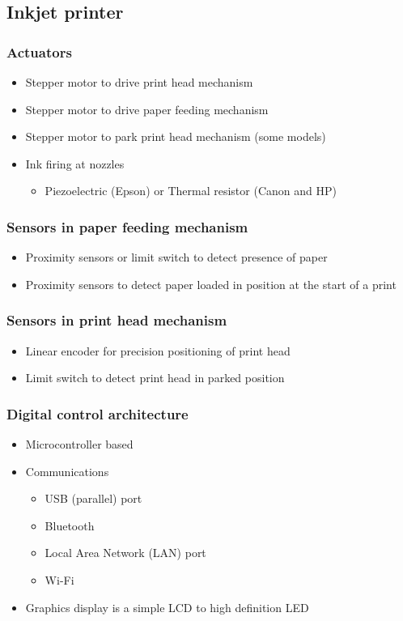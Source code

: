 \documentclass[11pt]{article}
\begin{document}
\subsection{Inkjet printer}
\label{sec:org6fff6bd}

\subsubsection{Actuators}
\label{sec:org7fe22f1}
\begin{itemize}
\item Stepper motor to drive print head mechanism
\item Stepper motor to drive paper feeding mechanism
\item Stepper motor to park print head mechanism (some models)
\item Ink firing at nozzles
\begin{itemize}
\item Piezoelectric (Epson) or Thermal resistor (Canon and HP)
\end{itemize}
\end{itemize}

\subsubsection{Sensors in paper feeding mechanism}
\label{sec:org490cb4a}
\begin{itemize}
\item Proximity sensors or limit switch to detect presence of paper
\item Proximity sensors to detect paper loaded in position at the start of a print
\end{itemize}

\subsubsection{Sensors in print head mechanism}
\label{sec:orgf12955d}
\begin{itemize}
\item Linear encoder for precision positioning of print head
\item Limit switch to detect print head in parked position
\end{itemize}

\subsubsection{Digital control architecture}
\label{sec:orgbe7a34a}
\begin{itemize}
\item Microcontroller based
\item Communications
\begin{itemize}
\item USB (parallel) port
\item Bluetooth
\item Local Area Network (LAN) port
\item Wi-Fi
\end{itemize}
\item Graphics display is a simple LCD to high definition LED
\end{itemize}
\end{document}
